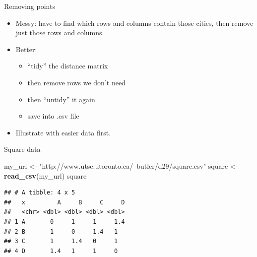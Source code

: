 \documentclass[ignorenonframetext,]{beamer}
\newenvironment{Shaded}{\begin{snugshade}}{\end{snugshade}}
\newcommand{\KeywordTok}[1]{\textcolor[rgb]{0.13,0.29,0.53}{\textbf{#1}}}
\newcommand{\NormalTok}[1]{#1}
\newcommand{\StringTok}[1]{\textcolor[rgb]{0.31,0.60,0.02}{#1}}
\begin{document}
\begin{frame}{Removing points}
\protect\hypertarget{removing-points}{}

\begin{itemize}
\item
  Messy: have to find which rows and columns contain those cities, then
  remove just those rows and columns.
\item
  Better:

  \begin{itemize}
  \item
    ``tidy'' the distance matrix
  \item
    then remove rows we don't need
  \item
    then ``untidy'' it again
  \item
    save into .csv file
  \end{itemize}
\item
  Illustrate with easier data first.
\end{itemize}

\end{frame}

\begin{frame}[fragile]{Square data}
\protect\hypertarget{square-data}{}

\begin{Shaded}
\begin{Highlighting}[]
\NormalTok{my_url <-}\StringTok{ "http://www.utsc.utoronto.ca/~butler/d29/square.csv"}
\NormalTok{square <-}\StringTok{ }\KeywordTok{read_csv}\NormalTok{(my_url)}
\NormalTok{square}
\end{Highlighting}
\end{Shaded}

\begin{verbatim}
## # A tibble: 4 x 5
##   x         A     B     C     D
##   <chr> <dbl> <dbl> <dbl> <dbl>
## 1 A       0     1     1     1.4
## 2 B       1     0     1.4   1  
## 3 C       1     1.4   0     1  
## 4 D       1.4   1     1     0
\end{verbatim}

\end{frame}
\end{document}
